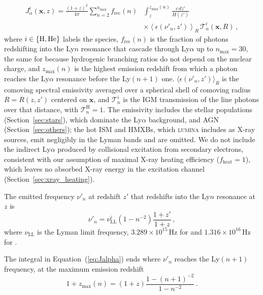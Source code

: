 \documentclass[apj,twocolumn, appendixfloats, twocolappendix, numberedappendix, tighten]{openjournal}
\DeclareRobustCommand{\lumina}{\mbox{\textsc{lumina}}\xspace}
\begin{document}
\begin{appendix}
\begin{equation}
\begin{split}
    J^i_\alpha(\mathbf{x}, z) = \frac{(1+z)^2}{4\pi} \sum^{n_\mathrm{max}}_{n=2} f_\mathrm{rec}(n)
    &\int^{z_\mathrm{max}(n)}_z \frac{c\,dz'}{H(z')} \\
    &\times \left\langle \epsilon(\nu'_n, z') \right\rangle_{R}\, \mathcal{T}^i_n(\mathbf{x}, R)\,,
\end{split}
\label{eq:Jalpha}
\end{equation}
where $i \in \{{\rm H}, {\rm He}\}$ labels the species, $f_\mathrm{rec}(n)$ is the fraction of photons redshifting into the Ly$n$ resonance that cascade through Ly$\alpha$ \citep{Pritchard2006} up to $n_\mathrm{max}=30$, the same for  because hydrogenic branching ratios do not depend on the nuclear charge, and $z_\mathrm{max}(n)$ is the highest emission redshift from which a photon reaches the Ly$\alpha$ resonance before the Ly$(n+1)$ one. $\langle \epsilon(\nu'_n,z') \rangle_R$ is the comoving spectral emissivity averaged over a spherical shell of comoving radius $R = R(z,z')$ centered on $\mathbf{x}$, and $\mathcal{T}^i_n$ is the IGM transmission of the line photons over that distance, with $\mathcal{T}^{\mathrm{H}}_n = 1$. The emissivity includes the stellar populations (Section~\ref{sec:stars}), which dominate the Ly$\alpha$ background, and AGN (Section~\ref{sec:others}); the hot ISM and HMXBs, which \lumina includes as X-ray sources, emit negligibly in the Lyman bands and are omitted. We do not include the indirect Ly$\alpha$ produced by collisional excitation from secondary electrons, consistent with our assumption of maximal X-ray heating efficiency ($f_\mathrm{heat}=1$), which leaves no absorbed X-ray energy in the excitation channel (Section~\ref{sec:xray_heating}).


The emitted frequency $\nu'_n$ at redshift $z'$ that redshifts into the Ly$n$ resonance at $z$ is
\begin{equation}
    \nu'_n = \nu_\mathrm{LL}^i (1-n^{-2})\frac{1+z'}{1+z}\,,
\end{equation}
where $\nu_\mathrm{LL}$ is the Lyman limit frequency, $3.289 \times 10^{15}\, \mathrm{Hz}$ for  and $1.316 \times 10^{16}\, \mathrm{Hz}$ for .

The integral in Equation~(\ref{eq:Jalpha}) ends where $\nu'_n$ reaches the Ly$(n+1)$ frequency, at the maximum emission redshift
\begin{equation}
    1 + z_\mathrm{max}(n) = (1+z) \frac{1-(n+1)^{-2}}{1-n^{-2}}\,.
\end{equation}


\end{appendix}
\end{document}
